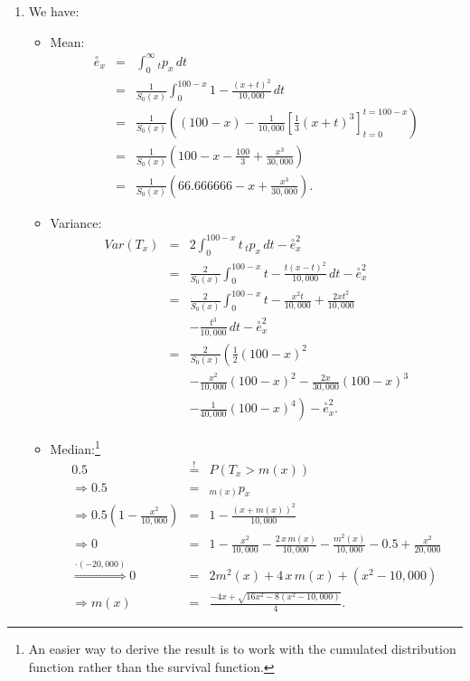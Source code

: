 \documentclass[11pt,fleqn,oneside]{book}
\begin{document}
\begin{enumerate}
\item We have:
\begin{itemize}
\item Mean: 
\begin{eqnarray*}
\stackrel{\circ}{e}_x &=& \int_0^\infty {_tp_x}\,dt \\
&=& \frac{1}{S_0(x)} \int_{0}^{100-x} 1 - \frac{(x+t)^2}{10,000}\,dt \\
&=& \frac{1}{S_0(x)} \left((100-x) - \frac{1}{10,000} \left[\frac{1}{3}(x+t)^3\right]_{t=0}^{t=100-x}\right)\\
&=& \frac{1}{S_0(x)}\left(100-x- \frac{100}{3} +\frac{x^3}{30,000}\right)\\
&=&\frac{1}{S_0(x)} \left( 66.666666 - x + \frac{x^3}{30,000} \right).
\end{eqnarray*}
\item Variance:
\begin{eqnarray*}
Var(T_x) &=& 2 \int_0^{100-x} t\,{_t p _x}\,dt - \stackrel{\circ}{e}^2_x \\
&=& \frac{2}{S_0(x)} \int_0^{100-x} t -\frac{t(x-t)^2}{10,000}\,dt - \stackrel{\circ}{e}^2_x  \\
&=& \frac{2}{S_0(x)} \int_0^{100-x} t  - \frac{x^2t}{10,000} + \frac{2xt^2}{10,000} \\
&& - \frac{t^3}{10,000}\,dt - \stackrel{\circ}{e}^2_x  \\
&=& \frac{2}{S_0(x)} \left( \frac{1}{2}(100-x)^2 \right.\\
&& - \frac{x^2}{10,000} (100-x)^2 -\frac{2x}{30,000} (100-x)^3 \\
&& \left. - \frac{1}{40,000} (100-x)^4 \right)
- \stackrel{\circ}{e}^2_x. 
\end{eqnarray*}
\item Median:\footnote{An easier way to derive the result is to work with the cumulated distribution function rather than the survival function.}
\begin{eqnarray*}
0.5 &\stackrel{!}{=} & P\left(T_x > m(x)\right) \\
\Rightarrow  0.5 &=& {_{m(x)}p_x}  \\
\Rightarrow 0.5\left(1 - \frac{x^2}{10,000}\right) &=& 1 - \frac{(x+m(x))^2}{10,000} \\
\Rightarrow 0 &=& 1 - \frac{x^2}{10,000} - \frac{2\,x\,m(x)}{10,000} - \frac{m^2(x)}{10,000}
- 0.5 + \frac{x^2}{20,000} \\
\stackrel{\cdot (-20,000)}{\Rightarrow}  
0&=& 2 m^2(x) + 4\,x\,m(x) + (x^2 - 10,000) \\
\Rightarrow m(x) &=& \frac{-4x + \sqrt{16x^2 - 8(x^2-10,000)}}{4}. 

\end{eqnarray*}
\end{itemize}
\end{enumerate}
\end{document}
